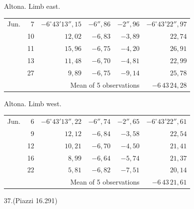 \noindent\begin{minipage}[t]{.495\textwidth}\centering Altona. Limb east.\par\smallskip
{\scriptsize\setlength{\tabcolsep}{1pt}\renewcommand{\arraystretch}{1.2}\begin{tabular}{lr|r|r|r|r|}
Jun.&7&$-6^\circ43'13''{,}15$&$-6''{,}86$&$-2''{,}96$&$-6^\circ43'22''{,}97$\\
&10&$12{,}02$&$-6{,}83$&$-3{,}89$&$22{,}74$\\
&11&$15{,}96$&$-6{,}75$&$-4{,}20$&$26{,}91$\\
&13&$11{,}48$&$-6{,}70$&$-4{,}81$&$22{,}99$\\
&27&$9{,}89$&$-6{,}75$&$-9{,}14$&$25{,}78$\\
\cline{6-6}\multicolumn{5}{r}{Mean of 5 observations}&$-6\,43\,24{,}28$
\end{tabular}}\end{minipage}\hfill\begin{minipage}[t]{.495\textwidth}\centering Altona. Limb west.\par\smallskip
{\scriptsize\setlength{\tabcolsep}{1pt}\renewcommand{\arraystretch}{1.2}\begin{tabular}{lr|r|r|r|r}
Jun.&6&$-6^\circ43'13''{,}22$&$-6''{,}74$&$-2''{,}65$&$-6^\circ43'22''{,}61$\\
&9&$12{,}12$&$-6{,}84$&$-3{,}58$&$22{,}54$\\
&12&$10{,}21$&$-6{,}70$&$-4{,}50$&$21{,}41$\\
&16&$8{,}99$&$-6{,}64$&$-5{,}74$&$21{,}37$\\
&22&$5{,}81$&$-6{,}82$&$-7{,}51$&$20{,}14$\\
\cline{6-6}\multicolumn{5}{r}{Mean of 5 observations}&$-6\,43\,21{,}61$
\end{tabular}}\end{minipage}
\par\vspace{4mm}
\begin{center}37.\quad (Piazzi 16.291)\end{center}

